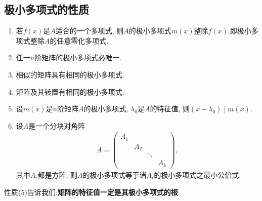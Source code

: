 \documentclass[../../main.tex]{subfiles}%
\begin{document}
\subsection{极小多项式的性质}

\begin{proposition}[极小多项式的性质]\label{proposition:极小多项式的性质}
\begin{enumerate}[(1)]
\item 若$f(x)$是$A$适合的一个多项式, 则$A$的极小多项式$m(x)$整除$f(x)$.即极小多项式整除$A$的任意零化多项式.

\item 任一$n$阶矩阵的极小多项式必唯一.

\item 相似的矩阵具有相同的极小多项式.

\item 矩阵及其转置有相同的极小多项式.

\item 设$m(x)$是$n$阶矩阵$A$的极小多项式, $\lambda_0$是$A$的特征值, 则$(x - \lambda_0) \mid m(x)$.

\item 设$A$是一个分块对角阵
\begin{align*}
A = \begin{pmatrix}
A_1 & & \\
& A_2 & \\
& & \ddots & \\
& & & A_k
\end{pmatrix},
\end{align*}
其中$A_i$都是方阵, 则$A$的极小多项式等于诸$A_i$的极小多项式之最小公倍式.
\end{enumerate}
\end{proposition}
\begin{note}
性质(5)告诉我们:\textbf{矩阵的特征值一定是其极小多项式的根}.
\end{note}
\end{document}
